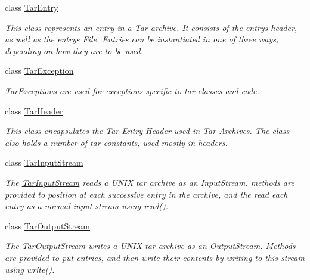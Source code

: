 \begin{DoxyCompactItemize}
class \hyperlink{class_i_c_sharp_code_1_1_sharp_zip_lib_1_1_tar_1_1_tar_entry}{Tar\+Entry}
\begin{DoxyCompactList}\small\item\em This class represents an entry in a \hyperlink{namespace_i_c_sharp_code_1_1_sharp_zip_lib_1_1_tar}{Tar} archive. It consists of the entry\textquotesingle{}s header, as well as the entry\textquotesingle{}s File. Entries can be instantiated in one of three ways, depending on how they are to be used. \end{DoxyCompactList}\item 
class \hyperlink{class_i_c_sharp_code_1_1_sharp_zip_lib_1_1_tar_1_1_tar_exception}{Tar\+Exception}
\begin{DoxyCompactList}\small\item\em Tar\+Exceptions are used for exceptions specific to tar classes and code. \end{DoxyCompactList}\item 
class \hyperlink{class_i_c_sharp_code_1_1_sharp_zip_lib_1_1_tar_1_1_tar_header}{Tar\+Header}
\begin{DoxyCompactList}\small\item\em This class encapsulates the \hyperlink{namespace_i_c_sharp_code_1_1_sharp_zip_lib_1_1_tar}{Tar} Entry Header used in \hyperlink{namespace_i_c_sharp_code_1_1_sharp_zip_lib_1_1_tar}{Tar} Archives. The class also holds a number of tar constants, used mostly in headers. \end{DoxyCompactList}\item 
class \hyperlink{class_i_c_sharp_code_1_1_sharp_zip_lib_1_1_tar_1_1_tar_input_stream}{Tar\+Input\+Stream}
\begin{DoxyCompactList}\small\item\em The \hyperlink{class_i_c_sharp_code_1_1_sharp_zip_lib_1_1_tar_1_1_tar_input_stream}{Tar\+Input\+Stream} reads a U\+N\+IX tar archive as an Input\+Stream. methods are provided to position at each successive entry in the archive, and the read each entry as a normal input stream using read(). \end{DoxyCompactList}\item 
class \hyperlink{class_i_c_sharp_code_1_1_sharp_zip_lib_1_1_tar_1_1_tar_output_stream}{Tar\+Output\+Stream}
\begin{DoxyCompactList}\small\item\em The \hyperlink{class_i_c_sharp_code_1_1_sharp_zip_lib_1_1_tar_1_1_tar_output_stream}{Tar\+Output\+Stream} writes a U\+N\+IX tar archive as an Output\+Stream. Methods are provided to put entries, and then write their contents by writing to this stream using write(). \end{DoxyCompactList}\end{DoxyCompactItemize}
